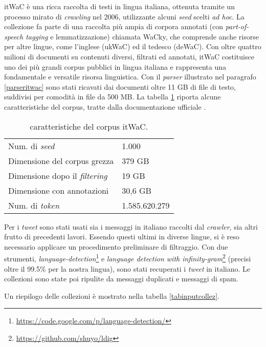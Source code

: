 itWaC è una ricca raccolta di testi in lingua italiana, ottenuta tramite un processo mirato di \textit{crawling} nel 2006, utilizzante alcuni \textit{seed} scelti \textit{ad hoc}.
La collezione fa parte di una raccolta più ampia di corpora annotati (con \textit{part-of-speech tagging} e lemmatizzazione) chiamata WaCky, che comprende anche risorse 
per altre lingue, come l’inglese (ukWaC) ed il tedesco (deWaC). Con oltre quattro milioni di documenti su contenuti diversi, filtrati ed annotati, itWaC costituisce uno dei più grandi 
corpus pubblici in lingua italiana e rappresenta una fondamentale e versatile risorsa linguistica.
Con il \textit{parser} illustrato nel paragrafo \ref{parseritwac} sono stati ricavati dai documenti oltre 11 GB di file di testo, suddivisi per comodità in file da 500 MB.
La tabella \ref{itwacstats} riporta alcune caratteristiche del corpus, tratte dalla documentazione ufficiale \cite{wacky}. 

\begin{table}[ht]
\centering
\begin{tabular}{|ll|}
\hline
Num. di \textit{seed}                 & 1.000         \\
Dimensione del corpus grezza & 379 GB        \\
Dimensione dopo il \textit{filtering} & 19 GB         \\
Dimensione con annotazioni   & 30,6 GB       \\
Num. di \textit{token}                & 1.585.620.279 \\ \hline
\end{tabular}
\caption{caratteristiche del corpus itWaC.}
\label{itwacstats}
\end{table}

Per i \textit{tweet} sono stati usati sia i messaggi in italiano raccolti dal \textit{crawler}, sia altri frutto di precedenti lavori. Essendo questi ultimi in diverse lingue, si è reso necessario applicare un
procedimento preliminare di filtraggio. Con due strumenti, \textit{language-detection}\footnote{\url{https://code.google.com/p/language-detection/}} e \textit{language detection with infinity-gram}\footnote{\url{https://github.com/shuyo/ldig}} 
(precisi oltre il 99.5\% per la nostra lingua), sono stati recuperati i \textit{tweet} in italiano. Le collezioni sono state poi ripulite da messaggi duplicati e messaggi di spam.

Un riepilogo delle collezioni è mostrato nella tabella \ref{tabinputcollez}.

